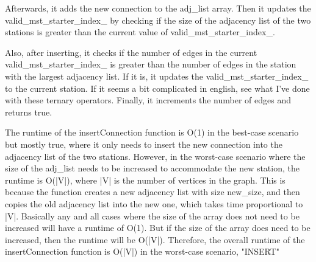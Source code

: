 \documentclass[a4paper]{article}
\begin{document}
			Afterwards, it adds the new connection to the {\color{draculapurple}adj\_list} array. Then it updates the {\color{draculapurple}valid\_mst\_starter\_index\_}
			by checking if the size of the adjacency list of the two stations is greater than the current value of {\color{draculapurple}valid\_mst\_starter\_index\_}.

			Also, after inserting, it checks if the number of edges in the current {valid\_mst\_starter\_index\_} is greater than the number of edges in the station with the largest adjacency list. If it is, it updates the {\color{draculapurple}valid\_mst\_starter\_index\_} to the current station.
			If it seems a bit complicated in english, see what I've done with these ternary operators.
			\newline
			\newline
			Finally, it increments the number of edges and returns {\color{draculapurple}true}.

			The runtime of the {\color{draculapurple}insertConnection} function is {\color{lightblue}O(1)} in the best-case scenario but mostly true, 
			where it only needs to insert the new connection into the adjacency list of the two stations. However, in the worst-case scenario where the 
			size of the {\color{draculapurple}adj\_list} needs to be increased to accommodate the new station, the runtime is {\color{lightblue}O(|V|)}, 
			where {\color{draculapurple}|V|} is the number of vertices in the graph. This is because the function creates a new adjacency list with size 
			{\color{draculapurple}new\_size}, and then copies the old adjacency list into the new one, which takes time proportional to {\color{draculapurple}|V|}.	
			Basically any and all cases where the size of the array does not need to be increased will have a runtime of {\color{lightblue}O(1)}.
			But if the size of the array does need to be increased, then the runtime will be {\color{lightblue}O(|V|)}.
			Therefore, the overall runtime of the {\color{draculapurple}insertConnection} function is {\color{lightblue}O(|V|)} in the worst-case scenario,
			{\color{GoldenYellow}"INSERT"}
\end{document}
